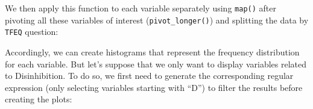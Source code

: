 \documentclass[
]{book}
\newenvironment{Shaded}{\begin{snugshade}}{\end{snugshade}}
\newcommand{\AttributeTok}[1]{\textcolor[rgb]{0.77,0.63,0.00}{#1}}
\newcommand{\ConstantTok}[1]{\textcolor[rgb]{0.00,0.00,0.00}{#1}}
\newcommand{\FunctionTok}[1]{\textcolor[rgb]{0.00,0.00,0.00}{#1}}
\newcommand{\NormalTok}[1]{#1}
\newcommand{\OtherTok}[1]{\textcolor[rgb]{0.56,0.35,0.01}{#1}}
\newcommand{\SpecialCharTok}[1]{\textcolor[rgb]{0.00,0.00,0.00}{#1}}
\newcommand{\StringTok}[1]{\textcolor[rgb]{0.31,0.60,0.02}{#1}}
\begin{document}
We then apply this function to each variable separately using \texttt{map()} after pivoting all these variables of interest (\texttt{pivot\_longer()}) and splitting the data by \texttt{TFEQ} question:

\begin{Shaded}
\end{Shaded}

Accordingly, we can create histograms that represent the frequency distribution for each variable. But let's suppose that we only want to display variables related to Disinhibition. To do so, we first need to generate the corresponding regular expression (only selecting variables starting with ``D'') to filter the results before creating the plots:
\end{document}
